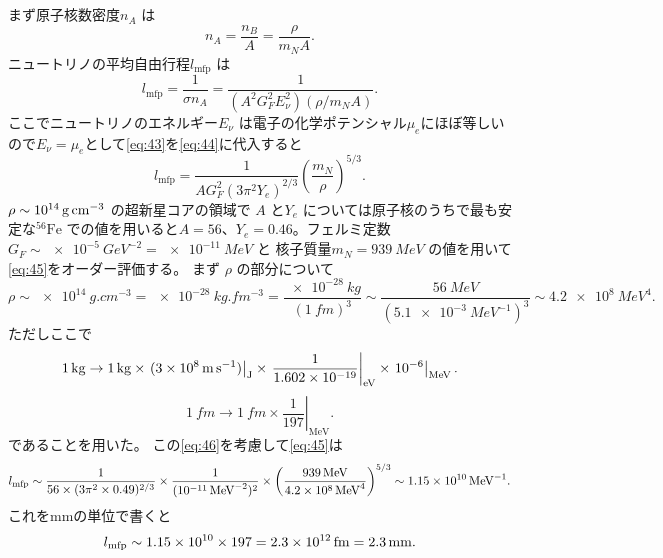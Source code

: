 \documentclass[dvipdfmx]{jsarticle}
\begin{document}
\subsection{}\label{4-3}
まず原子核数密度$n_A$ は
\[
n_A=\frac{n_B}{A}=\frac{\rho}{m_N A}
.\] 
ニュートリノの平均自由行程$l_\text{mfp} $ は
\begin{equation}
\label{eq:44}
	l_\text{mfp} =\frac{1}{\sigma n_A}=\frac{1}{(A^2G^2_FE^2_\nu)(\rho /m_N A)}
.\end{equation}
ここでニュートリノのエネルギー$E_\nu$ は電子の化学ポテンシャル$\mu_e$にほぼ等しいので$E_\nu=\mu_e$として\eqref{eq:43}を\eqref{eq:44}に代入すると
\begin{equation}
\label{eq:45}
	l_\text{mfp} = \frac{1}{AG_F^2(3\pi^2 Y_e)^{2 /3}}\left( \frac{m_N}{\rho} \right) ^{5 /3}
.\end{equation}
$\rho \sim  \SI{e 14}{g.cm^{-3}}$ の超新星コアの領域で
$A$ と$Y_e$ については原子核のうちで最も安定な$\mathrm{^{56}Fe}$ での値を用いると$A=56$、$Y_e=0.46$。フェルミ定数$G_F \sim \SI{e-5}{GeV^{-2}}=\SI{e-11}{MeV}$ と
核子質量$m_N=\SI{939}{MeV}$ の値を用いて\eqref{eq:45}をオーダー評価する。
まず $\rho$ の部分について
\begin{equation}
\label{eq:46}
	\rho\sim \SI{e14}{g.cm^{-3}}=\SI{e-28}{kg.fm^{-3}}=\frac{\SI{e-28}{kg}}{(\SI{1}{fm})^{3}}\sim \frac{\SI{56}{MeV}}{(\SI{5.1e-3}{MeV^{-1}})^{3}}\sim \SI{4.2 e8}{MeV^{4}}
.\end{equation}
\newpage
ただしここで
\[
\SI{1}{kg}\to  \SI{1}{kg}  \times \left. (\SI{3e 8}{m.s^{-1}}) \right|_\mathrm{J}  \times \left. \frac{1}{1.602\times 10^{-19}} \right| _\mathrm{eV}\times \left. 10^{-6} \right| _\mathrm{MeV}
.\] 
\[
\SI{1}{fm}\to \SI{1}{fm}\times \left. \frac{1}{197} \right| _\mathrm{MeV}
.\] 
であることを用いた。
この\eqref{eq:46}を考慮して\eqref{eq:45}は
\[
	l_\text{mfp} \sim \frac{1}{56\times (3\pi^2\times 0.49)^{2  /3}}\times \frac{1}{(\SI{e-11}{MeV^{-2}})^{2}}\times \left( \frac{\SI{939}{MeV}}{\SI{4.2e 8}{MeV^{4}}} \right) ^{5 /3}\sim \SI{1.15e 10}{MeV^{-1}} 
.\] 
これを\si{mm}の単位で書くと
\[
l_\text{mfp} \sim 1.15\times 10^{10}\times 197=\SI{2.3e 12}{fm}=\SI{2.3}{mm}
.\] 
\end{document}
